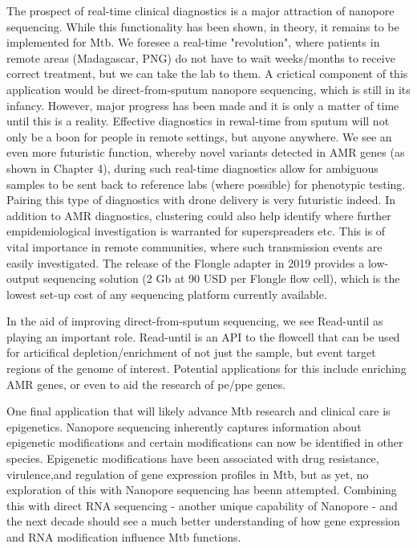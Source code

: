
The prospect of real-time clinical diagnostics is a major attraction of nanopore sequencing. While this functionality has been shown, in theory, it remains to be implemented for Mtb. We foresee a real-time "revolution", where patients in remote areas (Madagascar, PNG) do not have to wait weeks/months to receive correct treatment, but we can take the lab to them. A crictical component of this application would be direct-from-sputum nanopore sequencing, which is still in its infancy. However, major progress has been made and it is only a matter of time until this is a reality. Effective diagnostics in rewal-time from sputum will not only be a boon for people in remote settings, but anyone anywhere. We see an even more futuristic function, whereby novel variants detected in AMR genes (as shown in Chapter 4), during such real-time diagnostics allow for ambiguous samples to be sent back to reference labs (where possible) for phenotypic testing. Pairing this type of diagnostics with drone delivery is very futuristic indeed. In addition to AMR diagnostics, clustering could also help identify where further empidemiological investigation is warranted for superspreaders etc. This is of vital importance in remote communities, where such transmission events are easily investigated. The  release  of  the  Flongle  adapter  in  2019  provides  a  low-output sequencing solution (2 Gb at 90 USD per Flongle flow cell), which is the lowest set-up cost of any sequencing platform currently available. 

In the aid of improving direct-from-sputum sequencing, we see Read-until as playing an important role. Read-until is an API to the flowcell that can be used for articifical depletion/enrichment of not just the sample, but event target regions of the genome of interest. Potential applications for this include enriching AMR genes, or even to aid the research of pe/ppe genes.


One final application that will likely advance Mtb research and clinical care is epigenetics. Nanopore sequencing inherently captures information about epigenetic modifications and certain modifications can now be identified in other species. Epigenetic modifications have  been  associated  with  drug  resistance,  virulence,and regulation  of gene expression  profiles in Mtb, but as yet, no exploration of this with Nanopore sequencing has beenn attempted. Combining this with direct RNA sequencing - another unique capability of Nanopore - and the next decade should see a much better understanding of how gene expression and RNA modification influence Mtb functions.


